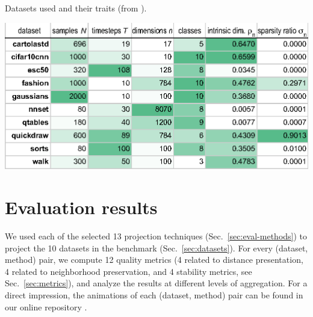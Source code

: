 \begin{table}
\centering
\caption{Datasets used and their traits (from \cite{Vernier2020}).}
\label{tab:datasets}
\includegraphics[width=\linewidth]{figures/projection-algorithm/datasets.eps}
\end{table}
  
\section{Evaluation results}
\label{sec:results}
%
We used each of the selected 13 projection techniques (Sec.~\ref{sec:eval-methods}) to project the 10 datasets in the benchmark (Sec.~\ref{sec:datasets}). For every (dataset, method) pair, we compute 12 quality metrics (4 related to distance presentation, 4 related to neighborhood preservation, and 4 stability metrics, see Sec.~\ref{sec:metrics}), and analyze the results at different levels of aggregation.
For a direct impression, the animations of each (dataset, method) pair can be found in our online repository \citep{repo-guided}.





